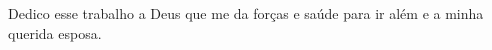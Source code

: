 \begin{dedicatoria}
 Dedico esse trabalho a Deus que me da forças e saúde para ir além  e a minha querida esposa.
\end{dedicatoria}